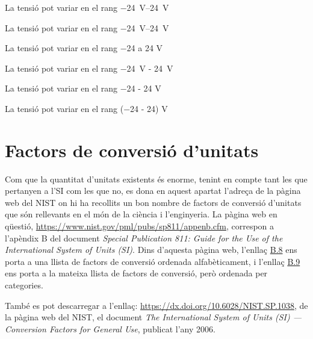 \begin{itemize}
\textcolor{Green}\faCheckSquare{} La tensió pot variar en el rang \qtyrange{-24}{24}{V}

\textcolor{Green}\faCheckSquare{} La tensió pot variar en el rang \qtyrange[range-units = bracket]{-24}{24}{V}

\textcolor{Blue}\faExclamationTriangle{}  La tensió pot variar en el rang \num{-24} a 24 V

\textcolor{Blue}\faExclamationTriangle{}  La tensió pot variar en el rang \qty{-24}{V} - \qty{24}{V}

\textcolor{Blue}\faExclamationTriangle{} La tensió pot variar en el rang \num{-24} - 24 V 

\textcolor{Blue}\faExclamationTriangle{} La tensió pot variar en el rang (\num{-24} - 24) V 

\end{itemize}


\section{Factors de conversió d'unitats}\label{sec:SI-fact-conv}
Com que la quantitat d'unitats existents és enorme, tenint en compte tant les que pertanyen a l'SI com les que no, es dona en aquest apartat l'adreça de la pàgina web del NIST on hi ha recollits un bon nombre de factors de conversió d'unitats que són rellevants en el món de la ciència i l'enginyeria.
La pàgina web en  qüestió, \href{https://www.nist.gov/pml/pubs/sp811/appenb.cfm}{https:/\!\!/www.nist.gov/pml/pubs/sp811/appenb.cfm}, correspon a l'apèndix B del document \textit{Special Publication 811: Guide for the Use of the International System of Units (SI)}.
Dins d'aquesta pàgina web, l'enllaç \href{https://www.nist.gov/pml/pubs/sp811/appenb8.cfm}{B.8} ens porta a una llista de factors de conversió ordenada alfabèticament, i l'enllaç  \href{https://www.nist.gov/pml/pubs/sp811/appenb9.cfm}{B.9} ens porta a la mateixa llista de factors de conversió, però ordenada per categories.

També es pot descarregar a l'enllaç: \href{https://dx.doi.org/10.6028/NIST.SP.1038}{https:/\!\!/dx.doi.org/10.6028/NIST.SP.1038}, de la pàgina web del NIST, el document \textit{The International System of Units (SI) --- Conversion Factors
for General Use}, publicat l'any 2006.
